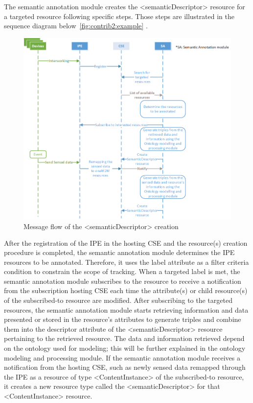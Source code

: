 The semantic annotation module creates the <semanticDescriptor> resource for a targeted resource following specific steps. Those steps are illustrated in the sequence diagram below~\ref{fig:contrib2:example} .\par
\begin{figure}[htbp]
    \centering
    \includegraphics[width=1.2\textwidth]{resources/images/sequence1}
    \caption{Message flow of the <semanticDescriptor> creation }\label{fig:contrib2:sequence1}
\end{figure}
After the registration of the IPE in the hosting CSE and the resource(s) creation procedure is completed, the semantic annotation module determines the IPE resources to be annotated. Therefore, it uses the label attribute as a filter criteria condition to constrain the scope of tracking. When a targeted label is met, the semantic annotation module subscribes to the resource to receive a notification from the subscription hosting CSE each time the attribute(s) or child resource(s) of the subscribed-to resource are modified. After subscribing to the targeted resources, the semantic annotation module starts retrieving information and data presented or stored in the resource’s attributes to generate triples and combine them into the descriptor attribute of the <semanticDescriptor> resource pertaining to the retrieved resource. The data and information retrieved depend on the ontology used for modeling; this will be further explained in the ontology modeling and processing module. If the semantic annotation module receives a notification from the hosting CSE, such as newly sensed data remapped through the IPE as a resource of type <ContentInstance> of the subscribed-to resource, it creates a new resource type called the <semanticDescriptor> for that <ContentInstance> resource. \par
